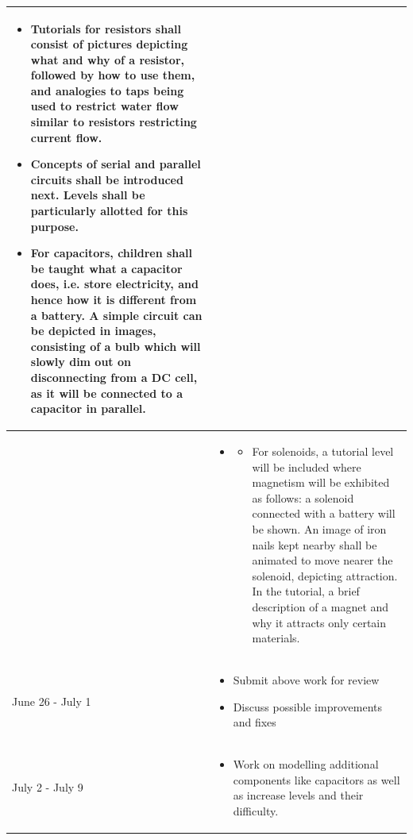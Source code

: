 \documentclass[preprint,12pt]{elsarticle}
\begin{document}
\begin{center}
\begin{tabularx}{\linewidth}{|l|X|}
{\begin{itemize}[noitemsep, topsep=2pt]
	\begin{itemize}[noitemsep, topsep=2pt]
		\item Tutorials for resistors shall consist of pictures depicting what and why of a resistor, followed by how to use them, and analogies to taps being used to restrict water flow similar to resistors restricting current flow.
		
		\item Concepts of serial and parallel circuits shall be introduced next. Levels shall be particularly allotted for this purpose.
		
		\item For capacitors, children shall be taught what a capacitor does, i.e. store electricity, and hence how it is different from  a battery. A simple circuit can be depicted in images, consisting of a bulb which will slowly dim out on disconnecting from a DC cell, as it will be connected to a capacitor in parallel.

	\end{itemize}
\end{itemize}
}\\
\hline

 & \par
 \parbox{12cm}{
	\begin{itemize}[noitemsep, topsep=2pt]
		\item[] 
		\begin{itemize}[noitemsep, topsep=2pt]
			\item For solenoids, a tutorial level will be included where magnetism will be exhibited as follows: a solenoid connected with a battery will be shown. An image of iron nails kept nearby shall be animated to move nearer the solenoid, depicting attraction. In the tutorial, a brief description of a magnet and why it attracts only certain materials.
		\end{itemize}
	\end{itemize}	 
 }\\
 \hline

{June 26 - July 1} & \par
\parbox{12cm}{
\begin{itemize}[noitemsep, topsep=2pt]
	\item Submit above work for review
	\item Discuss possible improvements and fixes
\end{itemize}
}\\
\hline

{July 2 - July 9} & \par
\parbox{12cm}{
\begin{itemize}[noitemsep, topsep=2pt]
	\item Work on modelling additional components like capacitors as well as increase levels and their difficulty.
	

\end{itemize}}
\end{tabularx}
\end{center}
\end{document}
